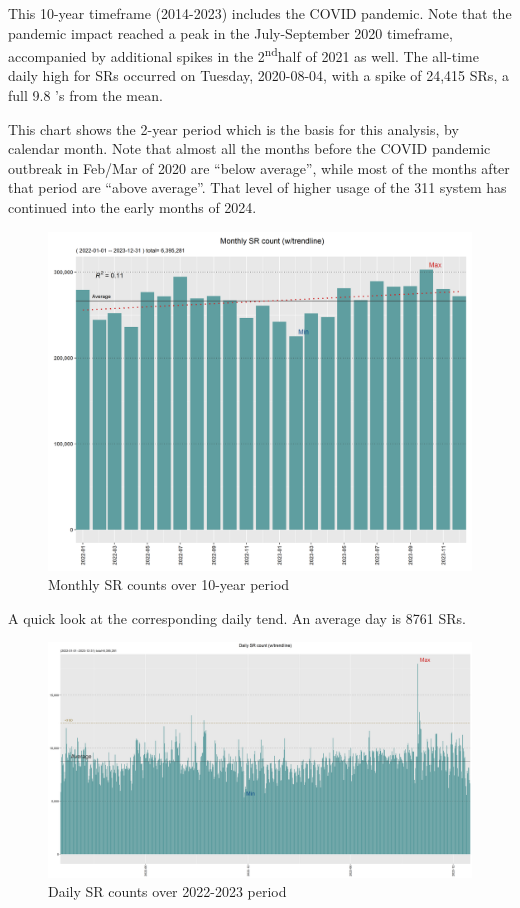 \documentclass[12pt, titlepage]{article}
\begin{document}
This 10-year timeframe (2014-2023) includes the COVID pandemic. Note that the pandemic
impact reached a peak in the July-September 2020 timeframe, accompanied by additional spikes
in the 2\textsuperscript{nd}half of 2021 as well. The all-time daily high for SRs occurred on Tuesday, 2020-08-04, 
with a spike of 24,415 SRs, a full 9.8 \textsigma's from the mean. 

This chart shows the 2-year period which is the basis for this analysis, by calendar month. 
Note that almost all the months before the COVID pandemic outbreak in Feb/Mar
of 2020 are ``below average'', while most of the months after that period are ``above average''. That level of higher usage
of the 311 system has continued into the early months of 2024.

\begin{figure}[htbp]
  \centering
  \includegraphics[width=\textwidth]{Monthly.png}
  \caption{Monthly SR counts over 10-year period}
  \label{fig:monthly-counts}
\end{figure}

A quick look at the corresponding  daily tend.  An average day is 8761 SRs. 

\begin{figure}[H]
  \centering
  \includegraphics[width=\textwidth]{Daily.png}
  \caption{Daily SR counts over 2022-2023 period}
  \label{fig:daily-counts}
\end{figure}
\end{document}

